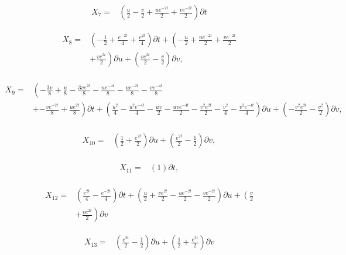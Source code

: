 \begin{align*}
X_{7}=&\left(\frac{u}{2}- \frac{v}{2}+\frac{u e^{- 2 t}}{2}+\frac{v e^{- 2 t}}{2} \right)\partial t
\end{align*}

\begin{align*}
X_{8}=&\left(- \frac{1}{2}+\frac{e^{- 2 t}}{4}+\frac{e^{2 t}}{4} \right)\partial t+\left(- \frac{u}{2}+\frac{u e^{- 2 t}}{2}+\frac{v e^{- 2 t}}{2}\right.\\
&+\left.\frac{v e^{2 t}}{2} \right)\partial u+\left(\frac{v e^{2 t}}{2} - \frac{v}{2} \right)\partial v,\\
\end{align*}

\begin{align*}
X_{9}=&\left(- \frac{3 v}{8}+\frac{u}{8}- \frac{3 v e^{2 t}}{8}- \frac{u e^{- 4 t}}{8}- \frac{u e^{- 2 t}}{8}- \frac{v e^{- 4 t}}{8}\right.\\
&+\left.- \frac{v e^{- 2 t}}{8}+\frac{u e^{2 t}}{8} \right)\partial t+\left(\frac{u^{2}}{4} - \frac{u^{2} e^{- 4 t}}{4} - \frac{u v}{2} - \frac{u v e^{- 4 t}}{2} - \frac{v^{2} e^{2 t}}{2} - \frac{v^{2}}{4} - \frac{v^{2} e^{- 4 t}}{4} \right)\partial u+\left(- \frac{v^{2} e^{2 t}}{2} - \frac{v^{2}}{2} \right)\partial v,\\
\end{align*}

\begin{align*}
X_{10}=&\left(\frac{1}{2}+\frac{e^{2 t}}{2} \right)\partial u+\left(\frac{e^{2 t}}{2} - \frac{1}{2} \right)\partial v,\\
\end{align*}

\begin{align*}
X_{11}=&\left(1 \right)\partial t,\\
\end{align*}

\begin{align*}
X_{12}=&\left(\frac{e^{2 t}}{4} - \frac{e^{- 2 t}}{4} \right)\partial t+\left(\frac{u}{2}+\frac{v e^{2 t}}{2}- \frac{u e^{- 2 t}}{2}- \frac{v e^{- 2 t}}{2} \right)\partial u+\left(\frac{v}{2}\right.\\
&+\left.\frac{v e^{2 t}}{2} \right)\partial v
\end{align*}

\begin{align*}
X_{13}=&\left(\frac{e^{2 t}}{2} - \frac{1}{2} \right)\partial u+\left(\frac{1}{2}+\frac{e^{2 t}}{2} \right)\partial v
\end{align*}

